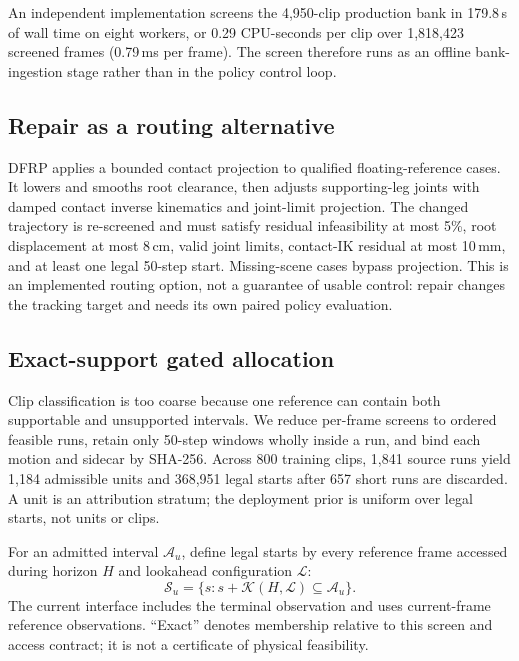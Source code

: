 \documentclass[letterpaper,10pt,conference]{ieeeconf}
\begin{document}
An independent implementation screens the 4,950-clip production bank in 179.8\,s of wall time on
eight workers, or 0.29 CPU-seconds per clip over 1,818,423 screened frames (0.79\,ms per frame).
The screen therefore runs as an offline bank-ingestion stage rather than in the policy control
loop.

\subsection{Repair as a routing alternative}
DFRP applies a bounded contact projection to qualified floating-reference cases. It lowers
and smooths root clearance, then adjusts supporting-leg joints with damped contact inverse
kinematics and joint-limit projection. The changed trajectory is re-screened and must
satisfy residual infeasibility at most 5\%, root displacement at most 8\,cm, valid joint
limits, contact-IK residual at most 10\,mm, and at least one legal 50-step start. Missing-scene
cases bypass projection. This is an implemented routing option, not a guarantee of usable
control: repair changes the tracking target and needs its own paired policy evaluation.

\subsection{Exact-support gated allocation}

Clip classification is too coarse because one reference can contain both supportable and
unsupported intervals. We reduce per-frame screens to ordered feasible runs, retain only 50-step
windows wholly inside a run, and bind each motion and sidecar by SHA-256. Across 800 training
clips, 1,841 source runs yield 1,184 admissible units and 368,951 legal starts after 657 short runs
are discarded. A unit is an attribution stratum; the deployment prior is uniform over legal
starts, not units or clips.

For an admitted interval $\mathcal A_u$, define legal starts by every reference
frame accessed during horizon $H$ and lookahead configuration $\mathcal L$:
\begin{equation}
\mathcal S_u=\{s:s+\mathcal K(H,\mathcal L)\subseteq\mathcal A_u\}.
\end{equation}
The current interface includes the terminal observation and uses current-frame reference
observations. ``Exact'' denotes membership relative to this screen and access contract;
it is not a certificate of physical feasibility.
\end{document}
